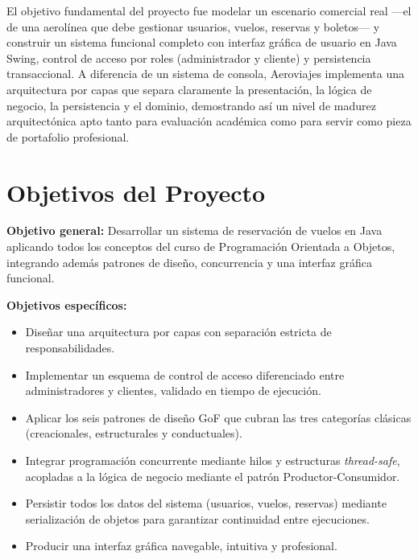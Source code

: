 \documentclass[12pt, letterpaper]{article}
\begin{document}
	El objetivo fundamental del proyecto fue modelar un escenario comercial real —el de una aerolínea que debe gestionar usuarios, vuelos, reservas y boletos— y construir un sistema funcional completo con interfaz gráfica de usuario en Java Swing, control de acceso por roles (administrador y cliente) y persistencia transaccional. A diferencia de un sistema de consola, Aeroviajes implementa una arquitectura por capas que separa claramente la presentación, la lógica de negocio, la persistencia y el dominio, demostrando así un nivel de madurez arquitectónica apto tanto para evaluación académica como para servir como pieza de portafolio profesional.
	
	\section{Objetivos del Proyecto}
	\textbf{Objetivo general:} Desarrollar un sistema de reservación de vuelos en Java aplicando todos los conceptos del curso de Programación Orientada a Objetos, integrando además patrones de diseño, concurrencia y una interfaz gráfica funcional.
	
	\textbf{Objetivos específicos:}
	\begin{itemize}
		\item Diseñar una arquitectura por capas con separación estricta de responsabilidades.
		\item Implementar un esquema de control de acceso diferenciado entre administradores y clientes, validado en tiempo de ejecución.
		\item Aplicar los seis patrones de diseño GoF que cubran las tres categorías clásicas (creacionales, estructurales y conductuales).
		\item Integrar programación concurrente mediante hilos y estructuras \textit{thread-safe}, acopladas a la lógica de negocio mediante el patrón Productor-Consumidor.
		\item Persistir todos los datos del sistema (usuarios, vuelos, reservas) mediante serialización de objetos para garantizar continuidad entre ejecuciones.
		\item Producir una interfaz gráfica navegable, intuitiva y profesional.
	\end{itemize}
	
\end{document}
